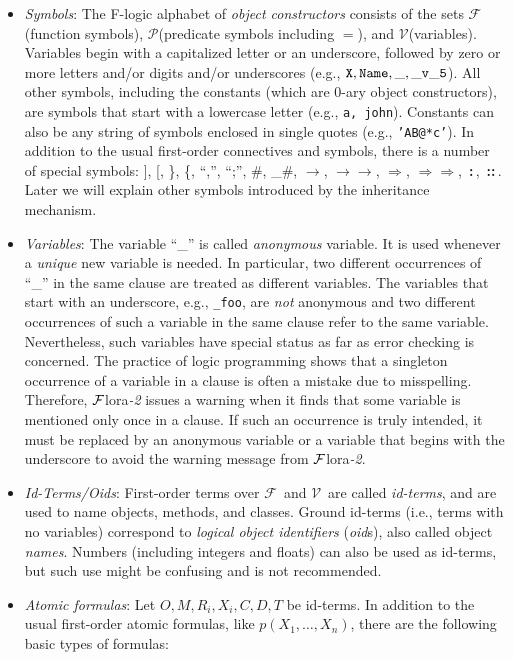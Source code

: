 \documentclass[11pt]{article}
\newcommand{\isa}{\,{\bf{:}}\,}
\newcommand{\subcl}{\,{\bf{::}}\,}
\newcommand{\fd}{\ensuremath{{\rightarrow}}}                   %
\newcommand{\mvd}{\ensuremath{{\rightarrow\!\!\!\!\rightarrow}}}  %
\newcommand{\Fd}{\ensuremath{{\Rightarrow}}}                      %
\newcommand{\Mvd}{\ensuremath{{\Rightarrow\!\!\!\!\Rightarrow}}}  %
\newcommand{\FLORA}{{\mbox{${\cal F}${\sc lora}\rm\emph{-2}}}\xspace}
\newcommand{\fl}{\mbox{F-logic}\xspace}
\newcommand{\funcs}{\ensuremath{\mathcal{F}}}
\newcommand{\preds}{\ensuremath{\mathcal{P}}}
\newcommand{\vars}{\ensuremath{\mathcal{V}}}
\begin{document}
\begin{itemize}
\item \emph{Symbols}: The \fl alphabet of \emph{object constructors}
  consists of the sets \funcs (function symbols), \preds (predicate symbols
  including $=$), and \vars (variables).  Variables begin with a
  capitalized letter or an underscore, followed by zero or more letters
  and/or digits and/or underscores (e.g., $\tt X, Name, \_, \_v\_5$).
  All other symbols, including the constants (which are 0-ary object
  constructors), are symbols that start with a lowercase letter (e.g., {\tt a,
  john}). Constants can also be any string of symbols enclosed in single
  quotes (e.g., {\tt 'AB@*c'}). 
  In addition to the usual first-order connectives and symbols, there is a
  number of special symbols:
  ], [, \}, \{, ``,'', ``;'', \#, \_\#, \fd, \mvd, \Fd,
  \Mvd, \isa, \subcl. Later we will explain other symbols introduced by
  the inheritance mechanism.
  
\item \emph{Variables}: The variable ``\_'' is called \emph{anonymous}
  variable. It is used whenever a \emph{unique} new variable is needed.
  In particular, two different occurrences of ``\_'' in the same clause are
  treated as different variables. The variables that start with an
  underscore, e.g., {\tt \_foo}, are \emph{not} anonymous and two
  different occurrences of such a variable in the same clause refer to the
  same variable. Nevertheless, such variables have special status as far as
  error checking is concerned. The practice of logic programming shows that
  a singleton occurrence of a variable in a clause is often a mistake
  due to misspelling. Therefore, \FLORA issues a warning when
  it finds that some variable is mentioned only once in a clause. If such
  an occurrence is truly intended, it must be replaced by an anonymous
  variable or a variable that begins with the underscore to avoid the
  warning message from \FLORA.

\item \emph{Id-Terms/Oids}:
    First-order terms over \funcs\ and \vars\ are called \emph{id-terms},
    and are used to name objects, methods, and classes.  Ground id-terms
    (i.e., terms with no variables) correspond to \emph{logical
      object identifiers} (\emph{oid}s), also called object \emph{names}.
    Numbers (including integers and floats) can also be used as id-terms,
    but such use might be confusing and is not recommended.
  \index{atomic formula!in \fl}
\item \emph{Atomic formulas}: Let $O,M,R_{i},X_{i},C,D,T$ be id-terms.  In
  addition to the usual first-order atomic formulas, like
  $p(X_1,\dots,X_n)$, there are the following basic types of formulas:
  \medskip


\end{itemize}
\end{document}
